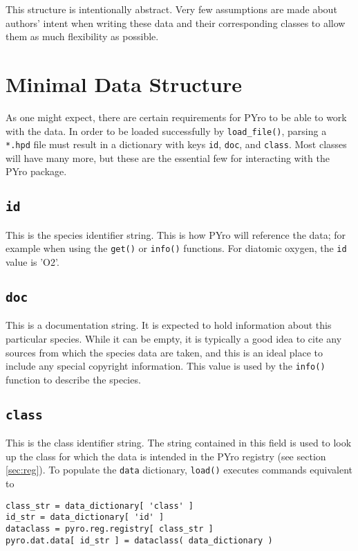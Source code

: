 This structure is intentionally abstract.  Very few assumptions are made about authors' intent when writing these data and their corresponding classes to allow them as much flexibility as possible.





\section{Minimal Data Structure}\label{sec:data:min}
As one might expect, there are certain requirements for PYro to be able to work with the data.  In order to be loaded successfully by \verb|load_file()|, parsing a \verb|*.hpd| file must result in a dictionary with keys \verb|id|, \verb|doc|, and \verb|class|.  Most classes will have many more, but these are the essential few for interacting with the PYro package.

\subsection{\texttt{id}}
This is the species identifier string.  This is how PYro will reference the data; for example when using the \verb|get()| or \verb|info()| functions.  For diatomic oxygen, the \verb|id| value is 'O2'.

\subsection{\texttt{doc}}
This is a documentation string.  It is expected to hold information about this particular species.  While it can be empty, it is typically a good idea to cite any sources from which the species data are taken, and this is an ideal place to include any special copyright information.  This value is used by the \verb|info()| function to describe the species.

\subsection{\texttt{class}}
This is the class identifier string.  The string contained in this field is used to look up the class for which the data is intended in the PYro registry (see section \ref{sec:reg}).  To populate the \verb|data| dictionary, \verb|load()| executes commands equivalent to
\begin{verbatim}
class_str = data_dictionary[ 'class' ]
id_str = data_dictionary[ 'id' ]
dataclass = pyro.reg.registry[ class_str ]
pyro.dat.data[ id_str ] = dataclass( data_dictionary )
\end{verbatim}

